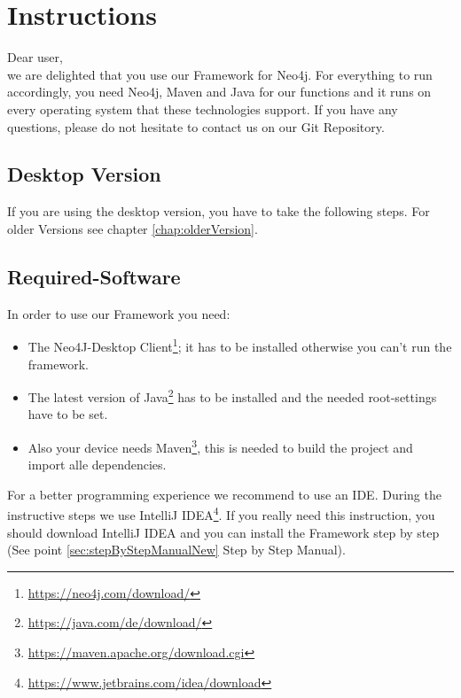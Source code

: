 \chapter{Instructions}\label{chap:zielbestimmung}
Dear user,\\
we are delighted that you use our Framework for Neo4j. For everything to run accordingly, you need Neo4j, Maven and Java for our functions and it runs on every operating system that these technologies support.
If you have any questions, please do not hesitate to contact us on our \glqq Git Repository\grqq{}.

\section{Desktop Version} \label{sec:desktop}
If you are using the desktop version, you have to take the following steps. For older Versions see chapter \ref{chap:olderVersion}.

\section{Required-Software}\label{sec:neededsoftwareNew}
In order to use our Framework you need:
\begin{itemize}
	\item The Neo4J-Desktop Client\footnote{\url{https://neo4j.com/download/}}; it has to be installed otherwise you can't run the framework.
	\item The latest version of Java\footnote{\url{https://java.com/de/download/}} has to be installed and the needed root-settings have to be set.
	\item Also your device needs Maven\footnote{\url{https://maven.apache.org/download.cgi}}, this is needed to build the project and import alle dependencies{}.
\end{itemize}
For a better programming experience we recommend to use an IDE. During the instructive steps we use IntelliJ IDEA\footnote{\url{https://www.jetbrains.com/idea/download}}. If you really need this instruction, you should download IntelliJ IDEA and you can install the Framework step by step (See point \ref{sec:stepByStepManualNew} Step by Step Manual).

\newpage


